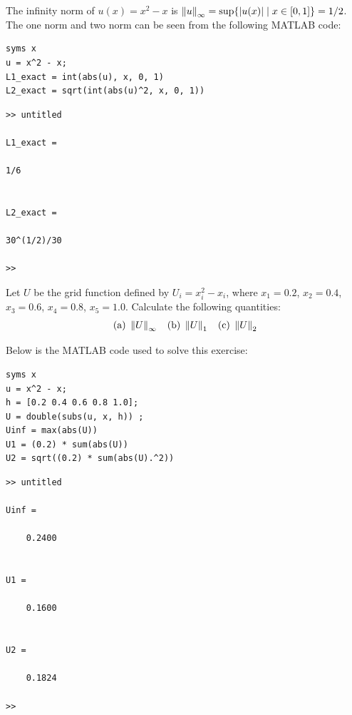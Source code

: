 \documentclass[12pt,twoside,openany]{memoir}
\begin{document}
\begin{solution}
    The infinity norm of $u(x) = x^2 - x$ is $\lnorm u \rnorm_\infty = \sup\{|u(x)| \mid x \in [0,1]\} = 1/2$. The one norm and two norm can be seen from the following MATLAB code:
\end{solution}

    \begin{lstlisting}[style=MatlabEditorGrey]
syms x
u = x^2 - x;
L1_exact = int(abs(u), x, 0, 1)
L2_exact = sqrt(int(abs(u)^2, x, 0, 1))
    \end{lstlisting}
    \begin{lstlisting}[style=Matlab-console]
>> untitled
 
L1_exact =
 
1/6
 
 
L2_exact =
 
30^(1/2)/30

>>
    \end{lstlisting}
\begin{exercise}[manual-num={A.4}]
    Let $U$ be the grid function defined by $U_i = x_i^2 - x_i$, where $x_1 = 0.2$, $x_2 = 0.4$, $x_3 = 0.6$, $x_4 = 0.8$, $x_5 = 1.0$. Calculate the following quantities:
    \begin{equation*}
    \begin{split}
        \text{(a)}\h3\lnorm U \rnorm_\infty\h9\text{(b)}\h3\lnorm U \rnorm_1\h9\text{(c)}\h3\lnorm U \rnorm_2
    \end{split}
    \end{equation*}
\end{exercise}
\begin{solution}
    Below is the \textsc{MATLAB} code used to solve this exercise:
    \begin{lstlisting}[style=MatlabEditorGrey]
syms x
u = x^2 - x;
h = [0.2 0.4 0.6 0.8 1.0];
U = double(subs(u, x, h)) ;
Uinf = max(abs(U))
U1 = (0.2) * sum(abs(U))
U2 = sqrt((0.2) * sum(abs(U).^2))
    \end{lstlisting}
    \begin{lstlisting}[style=Matlab-console]
>> untitled

Uinf =

    0.2400


U1 =

    0.1600


U2 =

    0.1824

>>
    \end{lstlisting}
\end{solution}
\end{document}
